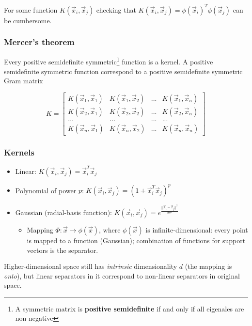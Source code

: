 For some function \(K(\vec{x}_i,\vec{x}_j)\) checking that \(K(\vec{x}_i,\vec{x}_j) = \phi(\vec{x}_i)^T \phi(\vec{x}_j)\) can be cumbersome.

\subsubsection{Mercer's theorem}
Every positive semidefinite symmetric\footnote{A symmetric matrix is \textbf{positive semidefinite} if and only if all eigenales are non-negative} function is a kernel. A positive semidefinite symmetric function correspond to a positive semidefinite symmetric Gram matrix

\begin{equation}
    K = 
    \begin{bmatrix}
        K(\vec{x}_1,\vec{x}_1) & K(\vec{x}_1,\vec{x}_2) & ... & K(\vec{x}_1,\vec{x}_n) \\
        K(\vec{x}_2,\vec{x}_1) & K(\vec{x}_2,\vec{x}_2) & ... & K(\vec{x}_2,\vec{x}_n) \\
        ... & ... & ... & ... \\
        K(\vec{x}_n,\vec{x}_1) & K(\vec{x}_n,\vec{x}_2) & ... & K(\vec{x}_n,\vec{x}_n) 
    \end{bmatrix}
\end{equation}

\subsubsection{Kernels}
\begin{itemize}[topsep=0pt, partopsep=0pt]
    \item Linear: \(K(\vec{x}_i,\vec{x}_j) = \vec{x}_i^T\vec{x}_j\)\\
    \item Polynomial of power \(p\): \(K(\vec{x}_i,\vec{x}_j) = (1 + \vec{x}_i^T \vec{x}_j)^p\)\\
    \item Gaussian (radial-basis function): \(K(\vec{x}_i,\vec{x}_j) = e^{\frac {||\vec{x}_i - \vec{x}_j||^2} {2 \sigma^2}}\)\\
        \begin{itemize}
        \item Mapping \(\Phi: \vec{x} \to \phi(\vec{x})\), where \(\phi(\vec{x})\) is infinite-dimensional: every point is mapped to a function (Gaussian); combination of functions for support vectors is the separator.\\
        \end{itemize}
\end{itemize}
Higher-dimensional space still has \emph{intrinsic} dimensionality \(d\) (the mapping is \emph{onto}), but linear separators in it correspond to non-linear separators in original space.

